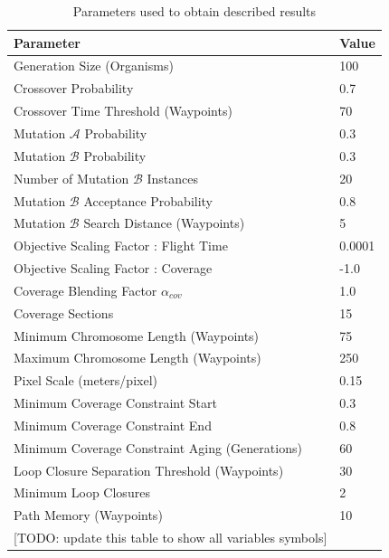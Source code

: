 \documentclass[letterpaper, 10 pt, conference]{ieeeconf}  %
\newcommand{\todo}[1]{{\color{blue}[TODO: #1]}}
\begin{document}
\begin{table}
  \caption{Parameters used to obtain described results}
\begin{tabular}{l|l}
\hline
\multicolumn{1}{|l|}{Parameter}                 & \multicolumn{1}{l|}{Value} \\ \hline
Generation Size (Organisms)                        & 100                     \\
Crossover Probability                              & 0.7                     \\
Crossover Time Threshold (Waypoints)               & 70                      \\
Mutation $\mathcal{A}$ Probability                 & 0.3                     \\
Mutation $\mathcal{B}$ Probability                 & 0.3                     \\
Number of Mutation $\mathcal{B}$ Instances         & 20                      \\
Mutation $\mathcal{B}$ Acceptance Probability      & 0.8                     \\
Mutation $\mathcal{B}$ Search Distance (Waypoints) & 5                       \\
Objective Scaling Factor : Flight Time             & 0.0001                  \\
Objective Scaling Factor : Coverage                & -1.0                    \\
Coverage Blending Factor $\alpha_{cov}$            & 1.0                     \\
Coverage Sections                                  & 15                      \\
Minimum Chromosome Length (Waypoints)              & 75                      \\
Maximum Chromosome Length (Waypoints)              & 250                     \\
Pixel Scale (meters/pixel)                         & 0.15                    \\
Minimum Coverage Constraint Start                  & 0.3                     \\
Minimum Coverage Constraint End                    & 0.8                     \\
Minimum Coverage Constraint Aging (Generations)    & 60                      \\
Loop Closure Separation Threshold (Waypoints)      & 30                      \\
Minimum Loop Closures                              & 2                       \\
Path Memory (Waypoints)                            & 10                      \\

\todo{update this table to show all variables symbols}\\
\end{tabular}
\label{tab:parameters}
\end{table}
\end{document}
